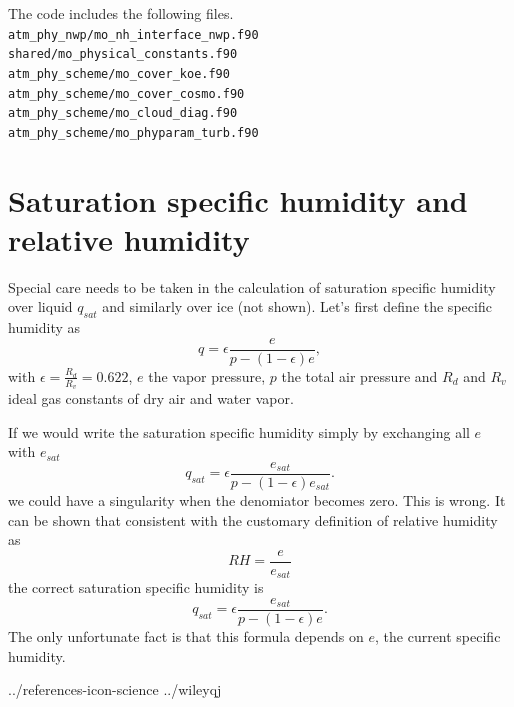 \documentclass[a4paper,11pt]{article}
\begin{document}
The code includes the following files.\\
\verb|atm_phy_nwp/mo_nh_interface_nwp.f90 |\\
\verb|shared/mo_physical_constants.f90    |\\
\verb|atm_phy_scheme/mo_cover_koe.f90     |\\
\verb|atm_phy_scheme/mo_cover_cosmo.f90   |\\
\verb|atm_phy_scheme/mo_cloud_diag.f90    |\\
\verb|atm_phy_scheme/mo_phyparam_turb.f90 |\\



\section{Saturation specific humidity and relative humidity}

Special care needs to be taken in the calculation of saturation specific humidity 
over liquid $q_{sat}$ and similarly over ice (not shown).  Let's first define the specific humidity as
\begin{equation}
q = \epsilon \frac{e}{p-(1-\epsilon)e} ,
\end{equation}
with $\epsilon=\frac{R_d}{R_v}=0.622$, $e$ the vapor pressure, $p$ the total air pressure and 
$R_d$ and $R_v$ ideal gas constants of dry air and water vapor.

If we would write the saturation specific humidity simply by exchanging all $e$ with $e_{sat}$ 
\begin{equation}
q_{sat} = \epsilon \frac{e_{sat}}{p-(1-\epsilon)e_{sat}}.
\end{equation}
we could have a singularity when the denomiator becomes zero.  This is wrong.  It can be shown 
that consistent with the customary definition of relative humidity as
\begin{equation}
RH = \frac{e}{e_{sat}}
\end{equation}
the correct saturation specific humidity is
\begin{equation}
q_{sat} = \epsilon \frac{e_{sat}}{p-(1-\epsilon)e}.
\end{equation}
The only unfortunate fact is that this formula depends on $e$, the current specific humidity. 



 {../references-icon-science}
 {../wileyqj} %
\end{document}
